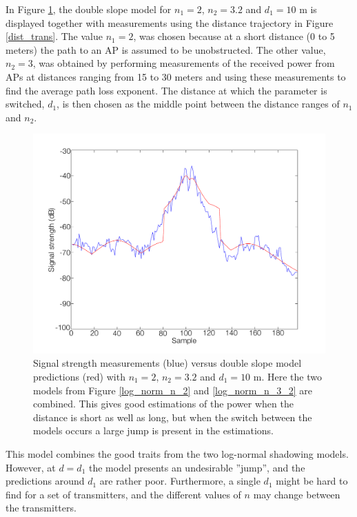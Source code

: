 \documentclass{LTHthesis}
\begin{document}
In Figure \ref{double_slope}, the double slope model for $n_1=2$, $n_2=3.2$ and $d_1=10$ m is displayed together with measurements using the distance trajectory in Figure \ref{dist_trans}. The value $n_1=2$, was chosen because at a short distance (0 to 5 meters) the path to an AP is assumed to be unobstructed. The other value, $n_2=3$, was obtained by performing measurements of the received power from APs at distances ranging from 15 to 30 meters and using these measurements to find the average path loss exponent. The distance at which the parameter is switched, $d_1$, is then chosen as the middle point between the distance ranges of $n_1$ and $n_2$. 
%
\begin{figure}[!hbt]

\includegraphics[width=1\textwidth ]{images/signal_model/double_slope}
\caption{Signal strength measurements (blue) versus double slope model predictions (red) with $n_1=2$, $n_2=3.2$ and $d_1=10$ m. Here the two models from Figure \ref{log_norm_n_2} and \ref{log_norm_n_3_2} are combined. This gives good estimations of the power when the distance is short as well as long, but when the switch between the models occurs a large jump is present in the estimations. }
\label{double_slope} 
\end{figure}

This model combines the good traits from the two log-normal shadowing models. However, at $d=d_1$ the model presents an undesirable ''jump'', and the predictions around $d_1$ are rather poor. Furthermore, a single $d_1$ might be hard to find for a set of transmitters, and the different values of $n$ may change between the transmitters.
%
\end{document}
